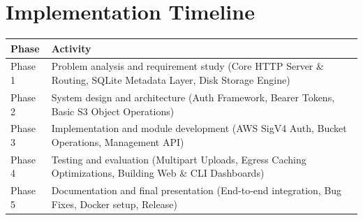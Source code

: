 \documentclass[12pt,a4paper]{report}
\begin{document}
\section{Implementation Timeline}
\begin{table}[H]
\centering
\begin{tabular}{|p{2cm}|p{12.5cm}|}
\toprule
\textbf{Phase} & \textbf{Activity} \\
\midrule
Phase 1 & Problem analysis and requirement study (Core HTTP Server \& Routing, SQLite Metadata Layer, Disk Storage Engine) \\
\midrule
Phase 2 & System design and architecture (Auth Framework, Bearer Tokens, Basic S3 Object Operations) \\
\midrule
Phase 3 & Implementation and module development (AWS SigV4 Auth, Bucket Operations, Management API) \\
\midrule
Phase 4 & Testing and evaluation (Multipart Uploads, Egress Caching Optimizations, Building Web \& CLI Dashboards) \\
\midrule
Phase 5 & Documentation and final presentation (End-to-end integration, Bug Fixes, Docker setup, Release) \\
\bottomrule
\end{tabular}
\end{table}
\end{document}
